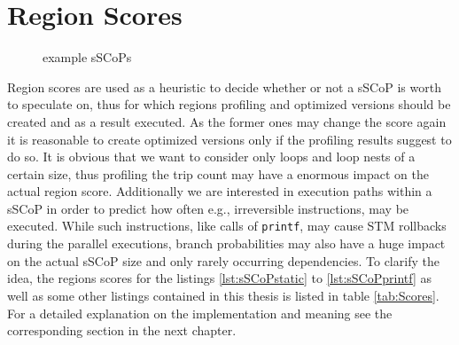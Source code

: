 \section{Region Scores}
\label{RegionScores}
\lstset{frame=none}
\begin{figure}[h]
  \centering

  \caption{example sSCoPs}
  \label{fig:ScoredSCoPs}
\end{figure}
\resetlst

Region scores are used as a heuristic to decide whether or not a sSCoP is worth
to speculate on, thus for which regions profiling and optimized versions should
be created and as a result executed.
As the former ones may change the score again it is reasonable to create 
optimized versions only if the profiling results suggest to do so. 
It is obvious that we want to consider only loops and loop nests of a certain size,
thus profiling the trip count may have a enormous impact on the actual region score.
Additionally we are interested in execution paths within a sSCoP in order to predict how often
e.g., irreversible instructions, may be executed. While such instructions, like
calls of \texttt{printf}, may cause STM rollbacks during the parallel executions, 
branch probabilities may also have a huge impact on the actual sSCoP size and
only rarely occurring dependencies. 
To clarify the idea,  the regions scores for the listings \ref{lst:sSCoPstatic}
to \ref{lst:sSCoPprintf} as well as some other listings contained in this 
thesis is listed in table \ref{tab:Scores}. For a detailed explanation on the 
implementation and meaning see the corresponding section in the next chapter. 

